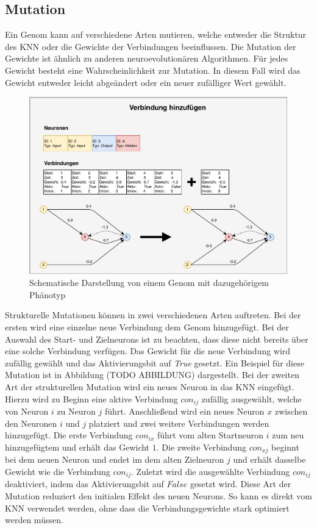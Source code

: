\subsection{Mutation}
\label{subsec:neat_mutation}
Ein Genom kann auf verschiedene Arten mutieren, welche entweder die Struktur des \ac{KNN} oder die Gewichte der Verbindungen beeinflussen. Die Mutation der Gewichte ist ähnlich zu anderen neuroevolutionären Algorithmen. Für jedes Gewicht besteht eine Wahrscheinlichkeit zur Mutation. In diesem Fall wird das Gewicht entweder leicht abgeändert oder ein neuer zufälliger Wert gewählt.\\ %
\begin{figure}[!h]
	\centering
	\includegraphics[width=1\textwidth]{./img/neat-AddConnectionMutation.pdf} 
	\caption{Schematische Darstellung von einem Genom mit dazugehörigem Phänotyp}
	\label{fig:neat_add_connectin_mutation}
\end{figure}
Strukturelle Mutationen können in zwei verschiedenen Arten auftreten. Bei der ersten wird eine einzelne neue Verbindung dem Genom hinzugefügt. Bei der Auswahl des Start- und Zielneurons ist zu beachten, dass diese nicht bereits über eine solche Verbindung verfügen. Das Gewicht für die neue Verbindung wird zufällig gewählt und das Aktivierungsbit auf \emph{True} gesetzt. Ein Beispiel für diese Mutation ist in Abbildung (TODO ABBILDUNG) dargestellt. Bei der zweiten Art der strukturellen Mutation wird ein neues Neuron in das \ac{KNN} eingefügt. Hierzu wird zu Beginn eine aktive Verbindung $con_{ij} $ zufällig ausgewählt, welche von Neuron $i$ zu Neuron $j$ führt. Anschließend wird ein neues Neuron $x$ zwischen den Neuronen $i$ und $j$ platziert und zwei weitere Verbindungen werden hinzugefügt. Die erste Verbindung $con_{ix}$ führt vom alten Startneuron $i$ zum neu hinzugefügtem und erhält das Gewicht $1$. Die zweite Verbindung $con_{xj}$ beginnt bei dem neuen Neuron und endet im dem alten Zielneuron $j$ und erhält dasselbe Gewicht wie die Verbindung $con_{ij}$. Zuletzt wird die ausgewählte Verbindung $con_{ij}$ deaktiviert, indem das Aktivierungsbit auf $False$ gesetzt wird. Diese Art der Mutation reduziert den initialen Effekt des neuen Neurons. So kann es direkt vom \ac{KNN} verwendet werden, ohne dass die Verbindungsgewichte stark optimiert werden müssen.
